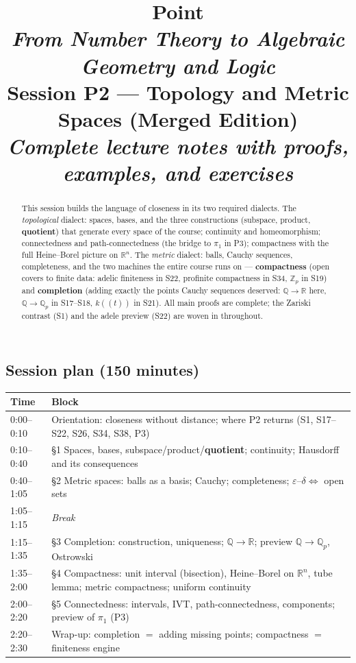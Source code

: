 \documentclass[11pt,a4paper]{article}
\title{
	{\color{blue!40!black}\textbf{\Huge Point}}\\[0.3em]
	\Large \textit{From Number Theory to Algebraic Geometry and Logic}\\[0.7em]
	\large \textbf{Session P2 --- Topology and Metric Spaces (Merged Edition)}\\[0.3em]
	\normalsize \emph{Complete lecture notes with proofs, examples, and exercises}
}
\author{}
\date{}
\theoremstyle{definition}
\newcommand{\R}{\mathbb{R}}
\newcommand{\Z}{\mathbb{Z}}
\newcommand{\Q}{\mathbb{Q}}
\begin{document}
	\maketitle
	\thispagestyle{empty}
	
	\begin{abstract}
		\noindent
		This session builds the language of closeness in its two required dialects. The \emph{topological}
		dialect: spaces, bases, and the three constructions (subspace, product, \textbf{quotient}) that
		generate every space of the course; continuity and homeomorphism; connectedness and
		path-connectedness (the bridge to $\pi_1$ in P3); compactness with the full Heine--Borel picture on
		$\R^n$. The \emph{metric} dialect: balls, Cauchy sequences, completeness, and the two machines the
		entire course runs on --- \textbf{compactness} (open covers to finite data: adelic finiteness in S22,
		profinite compactness in S34, $\Z_p$ in S19) and \textbf{completion} (adding exactly the points Cauchy
		sequences deserved: $\Q\to\R$ here, $\Q\to\Q_p$ in S17--S18, $k((t))$ in S21). All main proofs are
		complete; the Zariski contrast (S1) and the adele preview (S22) are woven in throughout.
	\end{abstract}
	
	\subsection*{Session plan (150 minutes)}
	\begin{center}\small
		\begin{tabular}{|l|p{12.9cm}|}
			\hline
			\textbf{Time} & \textbf{Block} \\
			\hline
			0:00--0:10 & Orientation: closeness without distance; where P2 returns (S1, S17--S22, S26, S34, S38, P3) \\
			0:10--0:40 & \S1 Spaces, bases, subspace/product/\textbf{quotient}; continuity; Hausdorff and its consequences \\
			0:40--1:05 & \S2 Metric spaces: balls as a basis; Cauchy; completeness; $\varepsilon$--$\delta\iff$ open sets \\
			1:05--1:15 & \emph{Break} \\
			1:15--1:35 & \S3 Completion: construction, uniqueness; $\Q\to\R$; preview $\Q\to\Q_p$, Ostrowski \\
			1:35--2:00 & \S4 Compactness: unit interval (bisection), Heine--Borel on $\R^n$, tube lemma; metric compactness; uniform continuity \\ 
			2:00--2:20 & \S5 Connectedness: intervals, IVT, path-connectedness, components; preview of $\pi_1$ (P3) \\
			2:20--2:30 & Wrap-up: completion $=$ adding missing points; compactness $=$ finiteness engine \\
			\hline
		\end{tabular}
	\end{center}
	
\end{document}
